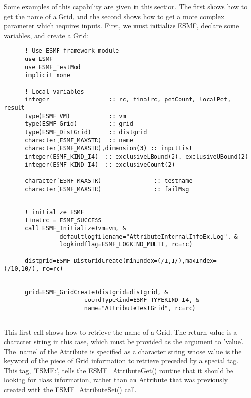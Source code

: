    Some examples of this capability are given in this section.  The first
   shows how to get the name of a Grid, and the second shows how
   to get a more complex parameter which requires inputs.  First, we must
   initialize ESMF, declare some variables, and create a Grid: 

 \begin{verbatim}
      ! Use ESMF framework module
      use ESMF
      use ESMF_TestMod
      implicit none

      ! Local variables  
      integer                 :: rc, finalrc, petCount, localPet, result
      type(ESMF_VM)           :: vm
      type(ESMF_Grid)         :: grid
      type(ESMF_DistGrid)     :: distgrid
      character(ESMF_MAXSTR)  :: name
      character(ESMF_MAXSTR),dimension(3) :: inputList 
      integer(ESMF_KIND_I4)  :: exclusiveLBound(2), exclusiveUBound(2)
      integer(ESMF_KIND_I4)  :: exclusiveCount(2)

      character(ESMF_MAXSTR)               :: testname
      character(ESMF_MAXSTR)               :: failMsg
 
\end{verbatim}
 

 \begin{verbatim}
      ! initialize ESMF
      finalrc = ESMF_SUCCESS
      call ESMF_Initialize(vm=vm, &
                defaultlogfilename="AttributeInternalInfoEx.Log", &
                logkindflag=ESMF_LOGKIND_MULTI, rc=rc)

      distgrid=ESMF_DistGridCreate(minIndex=(/1,1/),maxIndex=(/10,10/), rc=rc)
 
\end{verbatim}
 

 \begin{verbatim}
      grid=ESMF_GridCreate(distgrid=distgrid, &
                       coordTypeKind=ESMF_TYPEKIND_I4, &
                       name="AttributeTestGrid", rc=rc)
 
\end{verbatim}
 

    This first call shows how to retrieve the name of a Grid.  The 
    return value is a character string in this case, which must be
    provided as the argument to 'value'.  The 'name' of the Attribute
    is specified as a character string whose value is the keyword of the piece
    of Grid information to retrieve preceded by a special tag.
    This tag, 'ESMF:', tells the ESMF\_AttributeGet() routine that it
    should be looking for class information, rather than an Attribute
    that was previously created with the ESMF\_AttributeSet() call. 

